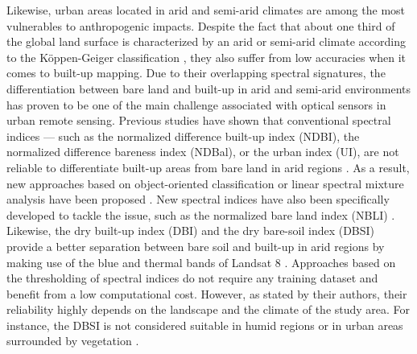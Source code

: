 \documentclass[remotesensing,article,submit,moreauthors,pdftex,10pt,a4paper]{Definitions/mdpi}
\begin{document}
Likewise, urban areas located in arid and semi-arid climates are among the most
vulnerables to anthropogenic impacts. Despite the fact that about one third of
the global land surface is characterized by an arid or semi-arid climate
according to the Köppen-Geiger classification \cite{Kottek2006, Rubel2017}, they
also suffer from low accuracies when it comes to built-up mapping. Due to their
overlapping spectral signatures, the differentiation between bare land and
built-up in arid and semi-arid environments has proven to be one of the main
challenge associated with optical sensors in urban remote sensing. Previous
studies have shown that conventional spectral indices --- such as the normalized
difference built-up index (NDBI), the normalized difference bareness index
(NDBal), or the urban index (UI), are not reliable to differentiate built-up
areas from bare land in arid regions \cite{Qian2007, Rasul2018}. As a result,
new approaches based on object-oriented classification or linear spectral
mixture analysis have been proposed \cite{Qian2007, Zhang2015}. New spectral
indices have also been specifically developed to tackle the issue, such as the
normalized bare land index (NBLI) \cite{Li2017}. Likewise, the dry built-up
index (DBI) and the dry bare-soil index (DBSI) provide a better separation
between bare soil and built-up in arid regions by making use of the blue and
thermal bands of Landsat 8 \cite{Rasul2018}. Approaches based on the
thresholding of spectral indices do not require any training dataset and benefit
from a low computational cost. However, as stated by their authors, their
reliability highly depends on the landscape and the climate of the study area.
For instance, the DBSI is not considered suitable in humid regions or in urban
areas surrounded by vegetation \cite{Rasul2018}.
\end{document}
